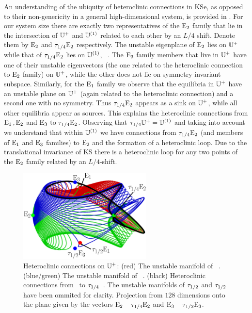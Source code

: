 An understanding of the ubiquity of heteroclinic connections in KSe, as
opposed to their non-genericity in a general high-dimensional system, is provided in .
For our system size
there are exactly two representatives
of the $\mathrm{E}_{2}$ family that lie in the intersection of $\mathbb{U}^+$ and $\mathbb{U}^{(1)}$ related
to each other by an $L/4$ shift. Denote them by $\mathrm{E}_{2}$ and $\tau_{1/4}\mathrm{E}_{2}$ respectively. The unstable eigenplane of
$\mathrm{E}_{2}$ lies on $\mathbb{U}^+$ while that of $\tau_{1/4}\mathrm{E}_{2}$ lies on $\mathbb{U}^{(1)}$, \cf\ .
The $\mathrm{E}_{3}$ family members that live in $\mathbb{U}^+$ have one of their unstable eigenvectors (the one related to the heteroclinic
connection to $\mathrm{E}_{2}$ family)  on $\mathbb{U}^+$, while the other does not lie on symmetry-invariant subspace.
Similarly, for the $\mathrm{E}_{1}$ family we observe that the equilibria in $\mathbb{U}^+$ have
an unstable plane on $\mathbb{U}^+$ (again related to the heteroclinic connection) and a second one with no symmetry.
Thus $\tau_{1/4}\mathrm{E}_{2}$ appears as a sink on $\mathbb{U}^+$, while all other equilibria appear as sources.
This explains the heteroclinic connections from $\mathrm{E}_{1}\,,\mathrm{E}_{2}$ and $\mathrm{E}_{3}$ to $\tau_{1/4}\mathrm{E}_{2}$.
Observing that $\tau_{1/4} \mathbb{U}^+= \mathbb{U}^{(1)}$ and taking into account  we understand that within $\mathbb{U}^{(1)}$
we have connections from $\tau_{1/4}\mathrm{E}_{2}$ (and members of $\mathrm{E}_{1}$ and $\mathrm{E}_{3}$ families) to $\mathrm{E}_{2}$ and the
formation of a heteroclinic loop. Due to the translational invariance of KS there is a heteroclinic loop for any two points
of the $\mathrm{E}_{2}$ family related by an $L/4$-shift.

\begin{figure}[t]
\begin{center}
        \includegraphics[width=0.6\textwidth, clip=true]{figs/KS22hetero.eps}
\end{center}
\caption{ Heteroclinic connections on $\mathbb{U}^+$:
 (red) The unstable manifold of ~\eqv.
 (blue/green) The unstable manifold of ~\eqv.
 (black) Heteroclinic connections from ~\eqv to $\tau_{1/4}$~\eqv.
 The unstable manifolds of $\tau_{1/2}$ and $\tau_{1/2}$ have been ommited
 for clarity. Projection from $128$ dimensions onto the plane given by the vectors
 $\mathrm{E}_{2}-\tau_{1/4}\mathrm{E}_{2}$ and $\mathrm{E}_{3}-\tau_{1/2}\mathrm{E}_{3}$.}
\label{f:KS22hetero}
\end{figure}


